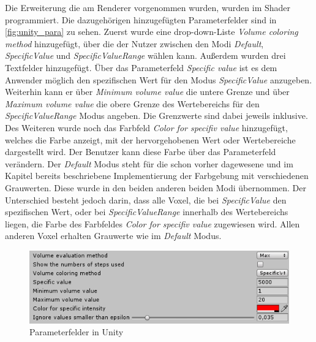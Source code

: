 Die Erweiterung die am Renderer vorgenommen wurden, wurden im Shader programmiert. Die dazugehörigen hinzugefügten Parameterfelder sind in \autoref{fig:unity_para} zu sehen. Zuerst wurde eine drop-down-Liste \textit{Volume coloring method}  hinzugefügt, über die der Nutzer zwischen den Modi \textit{Default}, \textit{SpecificValue} und \textit{SpecificValueRange} wählen kann. Außerdem wurden drei Textfelder hinzugefügt.
\newline
Über das Parameterfeld \textit{Specific value} ist es dem Anwender möglich den spezifischen Wert für den Modus \textit{SpecificValue} anzugeben. Weiterhin kann er über \textit{Minimum volume value} die untere Grenze und über \textit{Maximum volume value} die obere Grenze des Wertebereichs für den \textit{SpecificValueRange} Modus angeben. Die Grenzwerte sind dabei jeweils inklusive. Des Weiteren wurde noch das Farbfeld \textit{Color for specifiv value} hinzugefügt, welches die Farbe anzeigt, mit der hervorgehobenen Wert oder Wertebereiche dargestellt wird. Der Benutzer kann diese Farbe über das Parameterfeld verändern.
\newline
Der \textit{Default} Modus steht für die schon vorher dagewesene und im Kapitel  bereits beschriebene Implementierung der Farbgebung mit verschiedenen Grauwerten. Diese wurde in den beiden anderen beiden Modi übernommen. Der Unterschied besteht jedoch darin, dass alle Voxel, die bei \textit{SpecificValue} den spezifischen Wert, oder bei \textit{SpecificValueRange} innerhalb des Wertebereichs liegen, die Farbe des Farbfeldes \textit{Color for specifiv value} zugewiesen wird. Allen anderen Voxel erhalten Grauwerte wie im \textit{Default} Modus.


\begin{figure}[h]
\centering 
\includegraphics[width=\textwidth]{Logos/Unity_parameter.png}
\caption{Parameterfelder in Unity} 
\label{fig:unity_para} 
\end{figure}









































